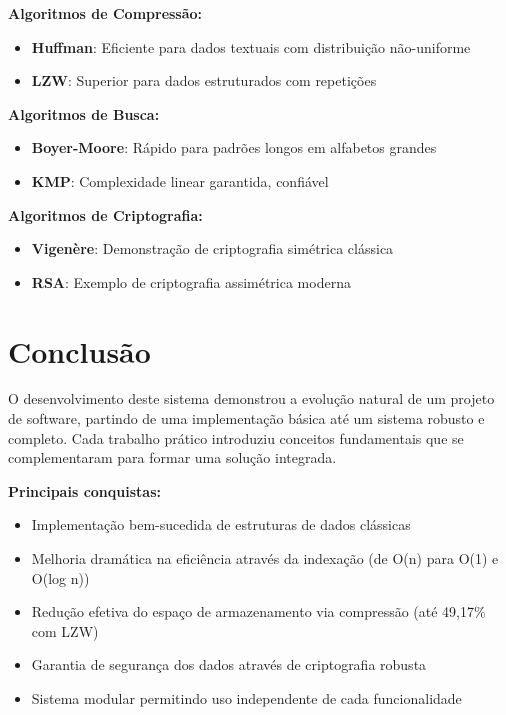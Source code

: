 \documentclass[12pt,a4paper]{article}
\let\oldsection\section
\renewcommand{\section}[1]{\needspace{4\baselineskip}\oldsection{#1}}
\begin{document}
\textbf{Algoritmos de Compressão:}
\begin{itemize}
    \item \textbf{Huffman}: Eficiente para dados textuais com distribuição não-uniforme
    \item \textbf{LZW}: Superior para dados estruturados com repetições
\end{itemize}

\textbf{Algoritmos de Busca:}
\begin{itemize}
    \item \textbf{Boyer-Moore}: Rápido para padrões longos em alfabetos grandes
    \item \textbf{KMP}: Complexidade linear garantida, confiável
\end{itemize}

\textbf{Algoritmos de Criptografia:}
\begin{itemize}
    \item \textbf{Vigenère}: Demonstração de criptografia simétrica clássica
    \item \textbf{RSA}: Exemplo de criptografia assimétrica moderna
\end{itemize}

\newpage %
\section{Conclusão}

O desenvolvimento deste sistema demonstrou a evolução natural de um projeto de software, partindo de uma implementação básica até um sistema robusto e completo. Cada trabalho prático introduziu conceitos fundamentais que se complementaram para formar uma solução integrada.

\textbf{Principais conquistas:}
\begin{itemize}
    \item Implementação bem-sucedida de estruturas de dados clássicas
    \item Melhoria dramática na eficiência através da indexação (de O(n) para O(1) e O(log n))
    \item Redução efetiva do espaço de armazenamento via compressão (até 49,17\% com LZW)
    \item Garantia de segurança dos dados através de criptografia robusta
    \item Sistema modular permitindo uso independente de cada funcionalidade
\end{itemize}
\end{document}
